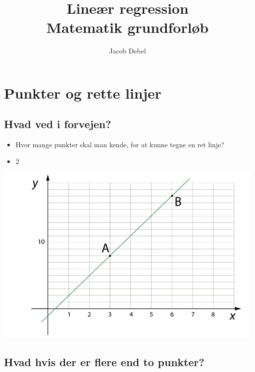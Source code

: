 \documentclass[11pt]{article}
\author{Jacob Debel}
\date{}
\title{Lineær regression\\\medskip
\large Matematik grundforløb}
\begin{document}
\maketitle



\section*{Punkter og rette linjer}
\label{sec:orgd36e194}

\subsection*{Hvad ved i forvejen?}
\label{sec:org2b89100}

\begin{itemize}
\item Hvor mange punkter skal man kende, for at kunne tegne en ret linje?
\item 2
\end{itemize}

\begin{center}
\includegraphics[width=.9\linewidth]{img/csm_haeldningen_a_ca5c3a73d5_2019-09-05_09-23-37.png}
\end{center}

\subsection*{Hvad hvis der er flere end to punkter?}
\label{sec:org8230d13}
\end{document}
